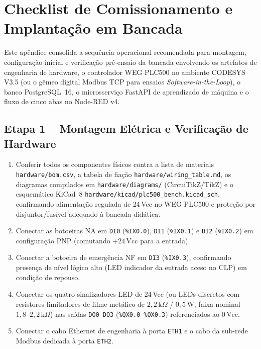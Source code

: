 
\chapter{Checklist de Comissionamento e Implantação em Bancada}
\label{ap:checklist}

Este apêndice consolida a sequência operacional recomendada para montagem, configuração inicial e verificação pré-ensaio da bancada envolvendo os artefatos de engenharia de hardware, o controlador WEG PLC500 no ambiente CODESYS V3.5 (ou o gêmeo digital Modbus TCP para ensaios \textit{Software-in-the-Loop}), o banco PostgreSQL~16, o microsserviço FastAPI de aprendizado de máquina e o fluxo de cinco abas no Node-RED v4.

\section{Etapa 1 -- Montagem Elétrica e Verificação de Hardware}
\begin{enumerate}
  \item Conferir todos os componentes físicos contra a lista de materiais \texttt{hardware/\allowbreak bom.csv}, a tabela de fiação \texttt{hardware/\allowbreak wiring\_\allowbreak table.md}, os diagramas compilados em \texttt{hardware/\allowbreak diagrams/} (CircuiTikZ/TikZ) e o esquemático KiCad~8 \texttt{hardware/\allowbreak kicad/\allowbreak plc500\_\allowbreak bench.\allowbreak kicad\_\allowbreak sch}, confirmando alimentação regulada de 24\,Vcc no WEG PLC500 e proteção por disjuntor/fusível adequado à bancada didática.
  \item Conectar as botoeiras NA em \texttt{DI0} (\texttt{\%IX0.0}), \texttt{DI1} (\texttt{\%IX0.1}) e \texttt{DI2} (\texttt{\%IX0.2}) em configuração PNP (comutando $+24\,\text{Vcc}$ para a entrada).
  \item Conectar a botoeira de emergência NF em \texttt{DI3} (\texttt{\%IX0.3}), confirmando presença de nível lógico alto (LED indicador da entrada aceso no CLP) em condição de repouso.
  \item Conectar os quatro sinalizadores LED de 24\,Vcc (ou LEDs discretos com resistores limitadores de filme metálico de $2{,}2\,\text{k}\Omega$ / $0{,}5\,\text{W}$, faixa nominal $1{,}8\text{--}2{,}2\,\text{k}\Omega$) nas saídas \texttt{DO0}--\texttt{DO3} (\texttt{\%QX0.0}--\texttt{\%QX0.3}) referenciados ao $0\,\text{Vcc}$.
  \item Conectar o cabo Ethernet de engenharia à porta \texttt{ETH1} e o cabo da sub-rede Modbus dedicada à porta \texttt{ETH2}.
\end{enumerate}

